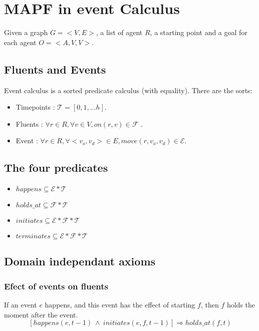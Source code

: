 \section{MAPF in event Calculus}\label{sec:introduction}

Given a graph $G = <V,E>$, a list of agent $R$, a starting point and a goal for each agent $O = <A,V,V>$.

\subsection{Fluents and Events}

Event calculus is a sorted predicate calculus (with equality). There are the sorts:

\begin{itemize}
  \item Timepoints : $\mathcal{T} = [0, 1, ... h]$.
  \item Fluents : $\forall r \in R, \forall v \in V, on(r,v) \in \mathcal{F}$ .
  \item Event : $\forall r \in R, \forall <v_o,v_d> \in E, move(r,v_o,v_d) \in \mathcal{E}$.
\end{itemize}

\subsection{The four predicates}

\begin{itemize}
  \item $happens \subseteq \mathcal{E}*\mathcal{T}$
  \item $holds\_at \subseteq \mathcal{F}*\mathcal{T}$
  \item $initiates \subseteq \mathcal{E}*\mathcal{F}*\mathcal{T}$
  \item $terminates \subseteq \mathcal{E}*\mathcal{F}*\mathcal{T}$
\end{itemize}

\subsection{Domain independant axioms}

\subsubsection{Efect of events on fluents}

If an event $e$ happens, and this event has the effect of starting $f$, then $f$ holds the moment after the event.
\begin{equation}
  \tag{E.1}
  [happens(e,t-1)\ \land\ initiates(e,f,t-1)] \Rightarrow holds\_at(f,t)
\end{equation}

